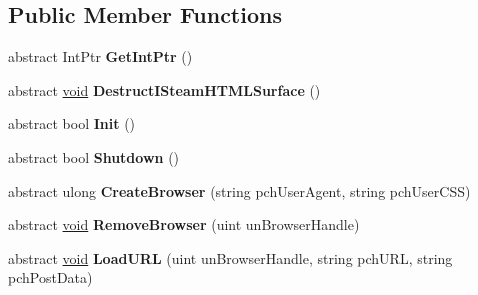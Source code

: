 \subsection*{Public Member Functions}
\begin{DoxyCompactItemize}
\item 
\hypertarget{classValve_1_1Steamworks_1_1ISteamHTMLSurface_af9b930b1aef525f8fea22d55fdd35571}{}abstract Int\+Ptr {\bfseries Get\+Int\+Ptr} ()\label{classValve_1_1Steamworks_1_1ISteamHTMLSurface_af9b930b1aef525f8fea22d55fdd35571}

\item 
\hypertarget{classValve_1_1Steamworks_1_1ISteamHTMLSurface_a9349420774347336f0949bba122179af}{}abstract \hyperlink{SDL__audio_8h_a52835ae37c4bb905b903cbaf5d04b05f}{void} {\bfseries Destruct\+I\+Steam\+H\+T\+M\+L\+Surface} ()\label{classValve_1_1Steamworks_1_1ISteamHTMLSurface_a9349420774347336f0949bba122179af}

\item 
\hypertarget{classValve_1_1Steamworks_1_1ISteamHTMLSurface_ad654601a94e23a0d465bb0809479233f}{}abstract bool {\bfseries Init} ()\label{classValve_1_1Steamworks_1_1ISteamHTMLSurface_ad654601a94e23a0d465bb0809479233f}

\item 
\hypertarget{classValve_1_1Steamworks_1_1ISteamHTMLSurface_a36dc1e883a6333a7239af6c5e84d6422}{}abstract bool {\bfseries Shutdown} ()\label{classValve_1_1Steamworks_1_1ISteamHTMLSurface_a36dc1e883a6333a7239af6c5e84d6422}

\item 
\hypertarget{classValve_1_1Steamworks_1_1ISteamHTMLSurface_a7ce09218f91e9f561a0c9f316cc877f6}{}abstract ulong {\bfseries Create\+Browser} (string pch\+User\+Agent, string pch\+User\+C\+S\+S)\label{classValve_1_1Steamworks_1_1ISteamHTMLSurface_a7ce09218f91e9f561a0c9f316cc877f6}

\item 
\hypertarget{classValve_1_1Steamworks_1_1ISteamHTMLSurface_a0ae0e3ff079e33bed9b8fc86867badc0}{}abstract \hyperlink{SDL__audio_8h_a52835ae37c4bb905b903cbaf5d04b05f}{void} {\bfseries Remove\+Browser} (uint un\+Browser\+Handle)\label{classValve_1_1Steamworks_1_1ISteamHTMLSurface_a0ae0e3ff079e33bed9b8fc86867badc0}

\item 
\hypertarget{classValve_1_1Steamworks_1_1ISteamHTMLSurface_adba79cb4536b7529fd6f9e0e4dc7c724}{}abstract \hyperlink{SDL__audio_8h_a52835ae37c4bb905b903cbaf5d04b05f}{void} {\bfseries Load\+U\+R\+L} (uint un\+Browser\+Handle, string pch\+U\+R\+L, string pch\+Post\+Data)\label{classValve_1_1Steamworks_1_1ISteamHTMLSurface_adba79cb4536b7529fd6f9e0e4dc7c724}


\end{DoxyCompactItemize}
